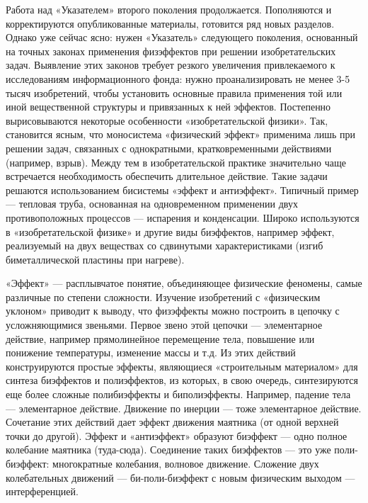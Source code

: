 Работа над «Указателем» второго  поколения продолжается. Пополняются и
корректируются опубликованные материалы, готовится ряд новых разделов.
Однако  уже  сейчас  ясно:  нужен  «Указатель»  следующего  поколения,
основанный  на  точных  законах  применения  физэффектов  при  решении
изобретательских  задач.   Выявление  этих  законов   требует  резкого
увеличения привлекаемого к  исследованиям информационного фонда: нужно
проанализировать  не менее  3-5  тысяч  изобретений, чтобы  установить
основные  правила  применения  той  или  иной  вещественной  структуры
и  привязанных к  ней  эффектов.  Постепенно вырисовываются  некоторые
особенности  «изобретательской  физики».  Так, становится  ясным,  что
моносистема  «физический эффект»  применима  лишь  при решении  задач,
связанных  с  однократными,   кратковременными  действиями  (например,
взрыв).  Между  тем  в   изобретательской  практике  значительно  чаще
встречается необходимость обеспечить длительное действие. Такие задачи
решаются  использованием  бисистемы  «эффект и  антиэффект».  Типичный
пример  —  тепловая  труба,  основанная  на  одновременном  применении
двух  противоположных  процессов  — испарения  и  конденсации.  Широко
используются  в «изобретательской  физике» и  другие виды  биэффектов,
например  эффект,   реализуемый  на   двух  веществах   со  сдвинутыми
характеристиками (изгиб биметаллической пластины при нагреве).

«Эффект»  — расплывчатое  понятие,  объединяющее физические  феномены,
самые  различные   по  степени   сложности.  Изучение   изобретений  с
«физическим уклоном» приводит к выводу, что физэффекты можно построить
в  цепочку  с  усложняющимися  звеньями.  Первое  звено  этой  цепочки
—  элементарное  действие,  например прямолинейное  перемещение  тела,
повышение или  понижение температуры, изменение  массы и т.д.  Из этих
действий  конструируются  простые  эффекты,  являющиеся  «строительным
материалом»  для  синтеза  биэффектов   и  полиэффектов,  из  которых,
в  свою  очередь,  синтезируются  еще более  сложные  полибиэффекты  и
биполиэффекты.  Например,   падение  тела  —   элементарное  действие.
Движение  по  инерции —  тоже  элементарное  действие. Сочетание  этих
действий  дает эффект  движения маятника  (от одной  верхней точки  до
другой).  Эффект  и  «антиэффект»  образуют  биэффект  —  одно  полное
колебание маятника (туда-сюда). Соединение  таких биэффектов — это уже
поли-биэффект:  многократные  колебания, волновое  движение.  Сложение
двух  колебательных движений  —  би-поли-биэффект  с новым  физическим
выходом — интерференцией.

